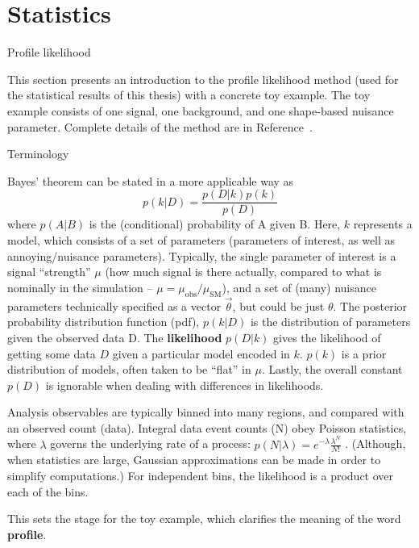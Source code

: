 \chapter{Statistics}
\label{appendix:statistics}

\begin{section}{Profile likelihood}


This section presents an introduction to the profile likelihood method
(used for the statistical results of this thesis) with a concrete toy example.
The toy example consists of one signal, one background, and one shape-based
nuisance parameter. Complete details of the method are in Reference~\cite{STAT:Cowan2010js}.


\begin{subsection}{Terminology}

Bayes' theorem can be stated in a more applicable way as
\begin{equation}
p(k|D) = \frac{p(D|k)p(k)}{p(D)}
\end{equation}
where $p(A|B)$ is the (conditional) probability of A given B.
Here, $k$ represents a model, which consists of a set of parameters 
(parameters of interest, as well as annoying/nuisance parameters). 
Typically, the single parameter of interest is a signal ``strength'' $\mu$
    (how much signal is there actually, compared to what is nominally in the simulation -- $\mu = \mu_\mathrm{obs}/\mu_\mathrm{SM}$), 
 and a set of (many) nuisance parameters technically specified
as a vector $\vec{\theta}$, but could be just $\theta$. The posterior probability 
distribution function (pdf), $p(k|D)$ is the distribution of parameters given the observed
data D. The \textbf{likelihood} $p(D|k)$ gives the likelihood of getting some data $D$
given a particular model encoded in $k$. $p(k)$ is a prior distribution of models, often
taken to be ``flat'' in $\mu$. Lastly, the overall constant $p(D)$ is ignorable when dealing
with differences in likelihoods.

Analysis observables are typically binned into many regions, and compared with an observed count (data).
Integral data event counts (N) obey Poisson statistics, where $\lambda$ governs the underlying
rate of a process: $p(N|\lambda) = e^{-\lambda}\frac{\lambda^N}{N!}$ .
(Although, when statistics are large, Gaussian approximations can be made in order to simplify computations.)
For independent bins, the likelihood is a product over each of the bins.

This sets the stage for the toy example, which clarifies the meaning of the word \textbf{profile}.




\end{subsection}
\end{section}
